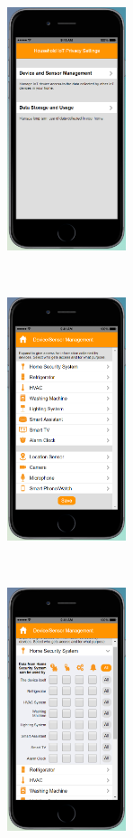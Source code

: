 \begin{figure}
	\centering
	\begin{subfigure}[t]{0.24\textwidth}
		\centering
		\includegraphics[height=2.8in]{figures/ui1allOff1.png}
	\end{subfigure}%
	~
	\begin{subfigure}[t]{0.24\textwidth}
		\centering
		\includegraphics[height=2.8in]{figures/ui1allOff2.png}
	\end{subfigure}%
	~
	\begin{subfigure}[t]{0.24\textwidth}
		\centering
		\includegraphics[height=2.8in]{figures/ui2allOff3.png}

\end{subfigure}
\end{figure}
